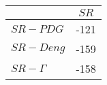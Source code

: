 \begin{tabular}{l|c}
\toprule
{} &  $SR$ \\
\midrule
\textbf{$SR-PDG$   } &  -121 \\
\textbf{$SR-Deng$  } &  -159 \\
\textbf{$SR-\Gamma$} &  -158 \\
\bottomrule
\end{tabular}
